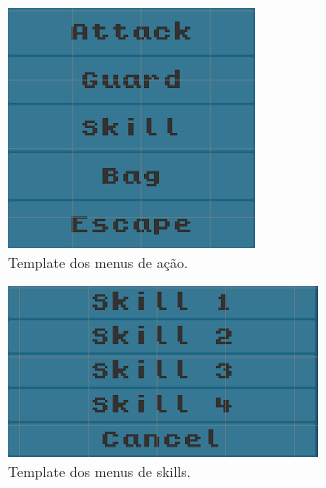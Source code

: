\documentclass[
	12pt,				%
	openright,			%
	twoside,			%
	a4paper,			%
	english,			%
	french,				%
	spanish,			%
	brazil				%
	]{abntex2}
\begin{document}
\begin{figure}[h!]
  \centering
  \begin{subfigure}[b]{0.25\linewidth}
    \includegraphics[width=\linewidth]{menutemplate.jpg}
     \caption{Template dos menus de ação.}
  \end{subfigure}
  \begin{subfigure}[b]{0.35\linewidth}
    \includegraphics[width=\linewidth]{skilltemplate.jpg}
    \caption{Template dos menus de skills.}
  \end{subfigure}
  \begin{subfigure}[b]{0.35\linewidth}

\end{subfigure}
\end{figure}
\end{document}
